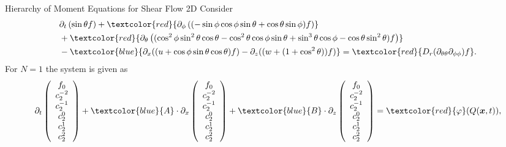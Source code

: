 \begin{frame}{Hierarchy of Moment Equations for Shear Flow 2D}
	\scriptsize
Consider
\begin{align*}
&\partial_{t}\left(\sin \theta f\right)+ \textcolor{red}{\partial_\phi \left((- \sin \phi \cos \phi \sin \theta + \cos \theta \sin \phi)f\right)} 
\\ &+ \textcolor{red}{\partial_\theta\left(( \cos^2 \phi \sin^2 \theta \cos \theta - \cos^2 \theta \cos \phi \sin \theta + \sin^3 \theta \cos \phi - \cos \theta \sin^2 \theta) f\right)}\\
&-\textcolor{blue}{\partial_x((u+\cos\phi \sin\theta \cos\theta)f) - \partial_z((w+(1+\cos^2\theta))f)}
= \textcolor{red}{D_{r}(\partial_{\theta\theta}\partial_{\phi\phi})f}.
\end{align*}
	For $N=1$ the system is given as
	\begin{equation}
		\partial_t \left(\begin{array}{c}
			f_0 \\
			c_2^{-2} \\
			c_2^{-1} \\
			c_2^0 \\
			c_2^1 \\
			c_2^2
		\end{array}\right) + \textcolor{blue}{A} \cdot \partial_x
		\left(\begin{array}{c}
			f_0 \\
			c_2^{-2} \\
			c_2^{-1} \\
			c_2^0 \\
			c_2^1 \\
			c_2^2
		\end{array}\right) + \textcolor{blue}{B} \cdot \partial_z \left(\begin{array}{c}
			f_0 \\
			c_2^{-2} \\
			c_2^{-1} \\
			c_2^0 \\
			c_2^1 \\
			c_2^2
		\end{array}\right) =  \textcolor{red}{\varphi} (Q(\boldsymbol{x},t)),
	\end{equation}
\end{frame}

